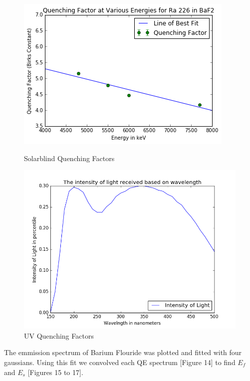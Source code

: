 \documentclass{article}
\begin{document}
\begin{figure}[H]
  \centering
  \begin{minipage}[b]{0.4\textwidth}
    \includegraphics[width=\textwidth]{qfsb.png}
    \caption{Solarblind Quenching Factors}
  \end{minipage}
  \hfill
  \begin{minipage}[b]{0.4\textwidth}
    \includegraphics[width=\textwidth]{PMT1QE.png}
    \caption{UV Quenching Factors}
  \end{minipage}
\end{figure}


The emmission spectrum of Barium Flouride was plotted and fitted with four gaussians. Using this fit we convolved each QE spectrum [Figure 14] to find $E_f$ and $E_s$ [Figures 15 to 17]. 
\end{document}
